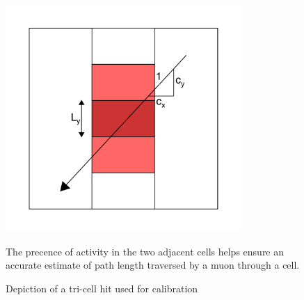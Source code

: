 \begin{figure}[t]
\begin{center}
\includegraphics[width=0.8\textwidth]{figures/plots/reco/calib_tricell}
\end{center}
\caption{Depiction of a tri-cell hit used for calibration}{The precence of
activity in the two adjacent cells helps ensure an accurate estimate of
path length traversed by a muon through a cell.}
\label{calib_tricell}
\end{figure}

